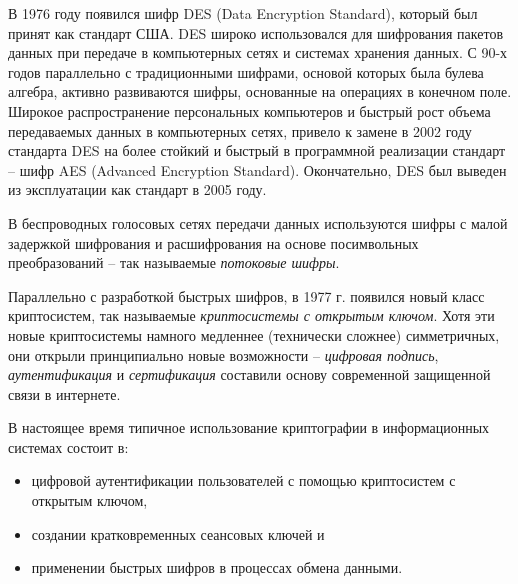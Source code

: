 В 1976 году появился шифр DES (Data Encryption Standard), который был принят как стандарт США. DES широко использовался для шифрования пакетов данных при передаче в компьютерных сетях и системах хранения данных. С 90-х годов параллельно с традиционными шифрами, основой которых была булева алгебра,  активно развиваются шифры, основанные на операциях в конечном поле.  Широкое распространение персональных компьютеров и быстрый рост объема передаваемых данных в компьютерных сетях,  привело к замене в 2002 году стандарта DES  на более стойкий и быстрый в программной реализации стандарт -- шифр AES (Advanced Encryption Standard). Окончательно, DES был выведен из эксплуатации как стандарт в 2005 году.

В беспроводных голосовых сетях передачи данных используются шифры с малой задержкой шифрования и расшифрования на основе посимвольных преобразований -- так называемые \emph{потоковые шифры}.


Параллельно с разработкой быстрых шифров, в 1977 г. появился новый класс криптосистем, так называемые \emph{криптосистемы с открытым ключом}. Хотя эти новые криптосистемы намного медленнее (технически сложнее) симметричных, они открыли принципиально новые возможности --  \emph{цифровая подпись}, \emph{аутентификация} и \emph{сертификация} составили основу современной защищенной связи в интернете.

В настоящее время типичное использование криптографии в информационных системах состоит в:
\begin{itemize}
\item цифровой аутентификации пользователей с помощью криптосистем с открытым ключом,
\item создании кратковременных сеансовых ключей и
\item применении быстрых шифров в процессах обмена данными.
\end{itemize}

